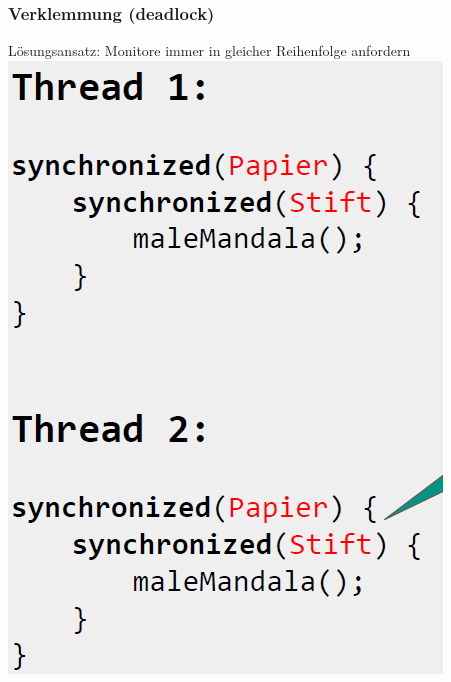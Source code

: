 \documentclass[18pt]{beamer}
\begin{document}
	
	\begin{frame}
		\frametitle{Verklemmung (deadlock)}
		\centering Lösungsansatz: Monitore immer in gleicher Reihenfolge anfordern \linebreak
		\includegraphics[scale=0.4]{./pics/tut5/deadlock-ex-sol.png}
	\end{frame}
\end{document}
